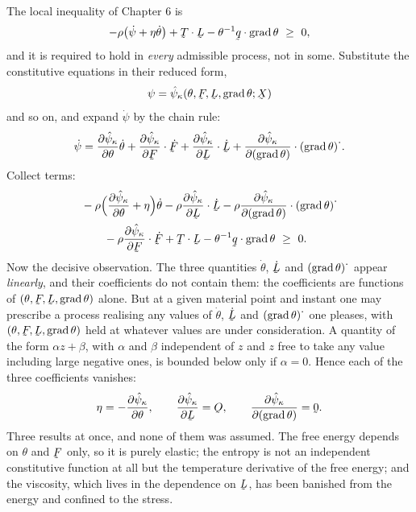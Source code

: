 \begin{remark}\label{rem:ch8cd}
The local inequality  of Chapter 6 is
\[
   -\rho\big(\dot\psi+\eta\dot\theta\big)+\ip\bT\bL
   -\theta^{-1}\ip\bq{\grad\theta}\ \geq\ 0 ,
\]
and it is required to hold in \emph{every} admissible process, not in
some. Substitute the constitutive equations in their reduced form,
\[
   \psi=\hat\psi_{\kappa}(\theta,\bF,\bL,\grad\theta;\bX)
\]
and so on, and expand $\dot\psi$ by the chain rule:
\[
   \dot\psi=\frac{\partial\hat\psi_{\kappa}}{\partial\theta}\dot\theta
   +\frac{\partial\hat\psi_{\kappa}}{\partial\bF}\cdot\dot\bF
   +\frac{\partial\hat\psi_{\kappa}}{\partial\bL}\cdot\dot\bL
   +\frac{\partial\hat\psi_{\kappa}}{\partial(\grad\theta)}
     \cdot(\grad\theta)^{\textstyle\cdot} .
\]
Collect terms:
\[
\begin{aligned}
   &-\rho\Big(\frac{\partial\hat\psi_{\kappa}}{\partial\theta}
   +\eta\Big)\dot\theta
   -\rho\frac{\partial\hat\psi_{\kappa}}{\partial\bL}\cdot\dot\bL
   -\rho\frac{\partial\hat\psi_{\kappa}}{\partial(\grad\theta)}
     \cdot(\grad\theta)^{\textstyle\cdot}\\
   &\qquad
   -\rho\frac{\partial\hat\psi_{\kappa}}{\partial\bF}\cdot\dot\bF
   +\ip\bT\bL-\theta^{-1}\ip\bq{\grad\theta}\ \geq\ 0 .
\end{aligned}
\]
Now the decisive observation. The three quantities $\dot\theta$,
$\dot\bL$ and $(\operatorname{grad}\theta)^{\textstyle\cdot}$ appear \emph{linearly},
and their coefficients do not contain them: the coefficients are
functions of $(\theta,\bF,\bL,\grad\theta)$ alone. But at a given
material point and instant one may prescribe a process realising any
values of $\dot\theta$, $\dot\bL$ and $(\operatorname{grad}\theta)^{\textstyle\cdot}$
one pleases, with $(\theta,\bF,\bL,\grad\theta)$ held at whatever values
are under consideration. A quantity of the form $\alpha z+\beta$, with
$\alpha$ and $\beta$ independent of $z$ and $z$ free to take any value
including large negative ones, is bounded below only if $\alpha=0$.
Hence each of the three coefficients vanishes:
\[
   \eta=-\frac{\partial\hat\psi_{\kappa}}{\partial\theta},
   \qquad
   \frac{\partial\hat\psi_{\kappa}}{\partial\bL}=\Ob,
   \qquad
   \frac{\partial\hat\psi_{\kappa}}{\partial(\grad\theta)}=\bze .
\]
Three results at once, and none of them was assumed. The free energy
depends on $\theta$ and $\bF$ only, so it is purely elastic; the
entropy is not an independent constitutive function at all but the
temperature derivative of the free energy; and the viscosity, which
lives in the dependence on $\bL$, has been banished from the energy and
confined to the stress.


\end{remark}
